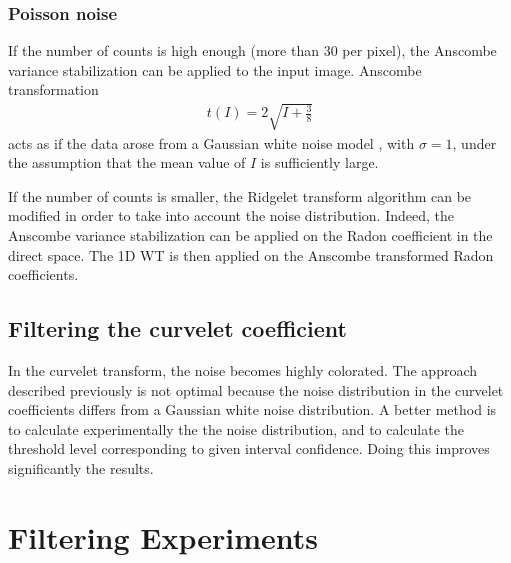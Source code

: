 \documentclass{article}
\begin{document}
\subsubsection{Poisson noise}
If the number of counts is high enough (more than 30 per pixel), 
the Anscombe variance stabilization
\cite{rest:anscombe48} can be applied to the input image. 
Anscombe  transformation 
\cite{rest:anscombe48}
\begin{eqnarray}
t(I) = 2\sqrt{I + \frac{3}{8}}
\label{eqn_anscombe}
\end{eqnarray}
acts as if the data arose from a
Gaussian white noise model \cite{rest:anscombe48}, with $\sigma = 1$, under the
assumption that the mean value of $I$ is sufficiently large.

If the number of counts is smaller,
the Ridgelet transform algorithm can be modified in order to take
into account the noise distribution. Indeed, the Anscombe variance 
stabilization can be applied on the Radon coefficient in the direct
space. The 1D WT is then applied on the Anscombe transformed Radon coefficients.


\subsection{Filtering the curvelet coefficient}
In the curvelet transform, the noise becomes highly colorated.
The approach described previously is not optimal because the
noise distribution in the curvelet coefficients 
differs from a Gaussian white noise distribution. A better method
is to calculate experimentally the the noise distribution, and to
calculate the threshold level corresponding to given interval confidence.
Doing this improves significantly the results.


\section{Filtering Experiments}
\end{document}
